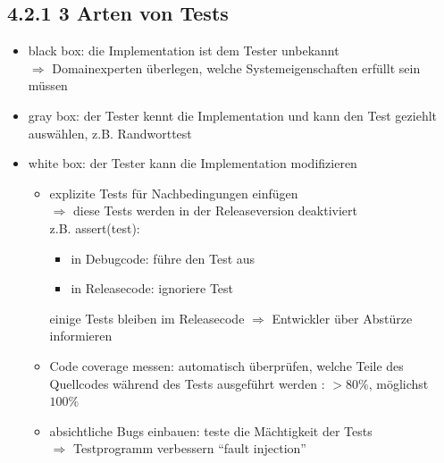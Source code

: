 \documentclass[11pt, fleqn]{scrreprt}
\begin{document}


\subsection*{4.2.1 3 Arten von Tests}
\begin{itemize}
	\item black box: die Implementation ist dem Tester unbekannt\\
	$\Rightarrow$ Domainexperten überlegen, welche Systemeigenschaften erfüllt sein müssen
	\item gray box: der Tester kennt die Implementation und kann den Test geziehlt auswählen, z.B. Randworttest
	\item white box: der Tester kann die Implementation modifizieren
	\begin{itemize}
		\item explizite Tests für Nachbedingungen einfügen \\
		$\Rightarrow$ diese Tests werden in der Releaseversion deaktiviert \\
		z.B. assert(test):
		\begin{itemize}
			\item in Debugcode: führe den Test aus
			\item in Releasecode: ignoriere Test
		\end{itemize}
		einige Tests bleiben im Releasecode $\Rightarrow$ Entwickler über Abstürze informieren
		\item Code coverage messen: automatisch überprüfen, welche Teile des Quellcodes während des Tests ausgeführt werden : $> 80\% $, möglichst $100\%$
		\item absichtliche Bugs einbauen: teste die Mächtigkeit der Tests\\
		$\Rightarrow$ Testprogramm verbessern ``fault injection''
	\end{itemize}
\end{itemize}
\end{document}
